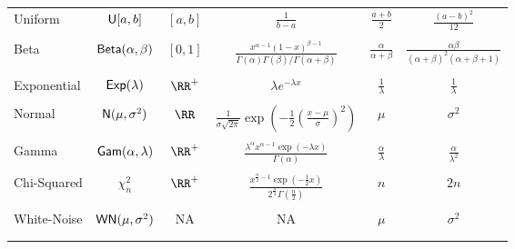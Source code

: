 \begin{longtable}{lccccc}
    Uniform           & ${\sf U} [a,b]$             & $[a,b]$                        & $\frac{1}{b-a}$                                                                                          & $\frac{a+b}{2}$          & $\frac{(a-b)^2}{12}$       \\\\
    Beta              & ${\sf Beta} (\alpha , \beta)$ & $[0,1]$                        & $\frac{x^{\alpha - 1} {(1-x)}^{\beta - 1}}{\Gamma (\alpha) \Gamma (\beta) / \Gamma (\alpha + \beta)}$    & $\frac{\alpha}{\alpha + \beta}$          & $\frac{\alpha \beta}{(\alpha + \beta)^2 (\alpha + \beta + 1)}$       \\\\
    Exponential       & ${\sf Exp} (\lambda)$         & $\RR^{+}$                      & $\lambda e^{-\lambda x}$                                                                                 & $\frac{1}{\lambda}$      & $\frac{1}{\lambda}$        \\\\
    Normal            & ${\sf N} (\mu, \sigma^2)$   & $\RR$                          & $\frac{1}{\sigma \sqrt{2 \pi}} \exp \left( -\frac{1}{2} \left( \frac{x - \mu}{\sigma} \right)^2 \right)$ & $\mu$                    & $\sigma^2$                 \\\\
    Gamma             & ${\sf Gam} (\alpha, \lambda)$ & $\RR^{+}$                      & $\frac{\lambda^{\alpha} x^{\alpha - 1} \exp (-\lambda x)}{\Gamma (\alpha)}$                              & $\frac{\alpha}{\lambda}$ & $\frac{\alpha}{\lambda^2}$ \\\\
    Chi-Squared       & $\chi^2_{n}$             & $\RR^{+}$                      & $\frac{x^{\frac{n}{2} - 1} \exp (-\frac{1}{2} x)}{2^{\frac{n}{2}} \Gamma (\frac{n}{2})}$                 & $n$                      & $2n$                       \\\\
    White-Noise       & ${\sf WN} (\mu , \sigma^2)$   & NA                             & NA                                                                                                       & $\mu$                    & $\sigma^2$                 \\\\

    \\\bottomrule
    \hline
\end{longtable}
